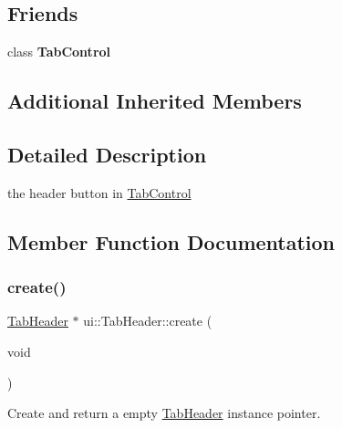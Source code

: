 \subsection*{Friends}
\begin{DoxyCompactItemize}
\item 
\mbox{\label{classui_1_1TabHeader_ac9692fc2c5496e24b8cfbe74c82266c4}} 
class {\bfseries Tab\+Control}
\end{DoxyCompactItemize}
\subsection*{Additional Inherited Members}


\subsection{Detailed Description}
the header button in \hyperlink{classui_1_1TabControl}{Tab\+Control} 

\subsection{Member Function Documentation}
\mbox{\label{classui_1_1TabHeader_ac39888c340b96ebdf6f488840024fd27}} 
\subsubsection{\texorpdfstring{create()}{create()}\hspace{0.1cm}{\footnotesize\ttfamily [1/6]}}
{\footnotesize\ttfamily \hyperlink{classui_1_1TabHeader}{Tab\+Header} $\ast$ ui\+::\+Tab\+Header\+::create (\begin{DoxyParamCaption}\item[{void}]{ }\end{DoxyParamCaption})\hspace{0.3cm}{\ttfamily [static]}}

Create and return a empty \hyperlink{classui_1_1TabHeader}{Tab\+Header} instance pointer. \mbox{\label{classui_1_1TabHeader_a91cf55f5d3dffe5693735f8741d15723}} 
